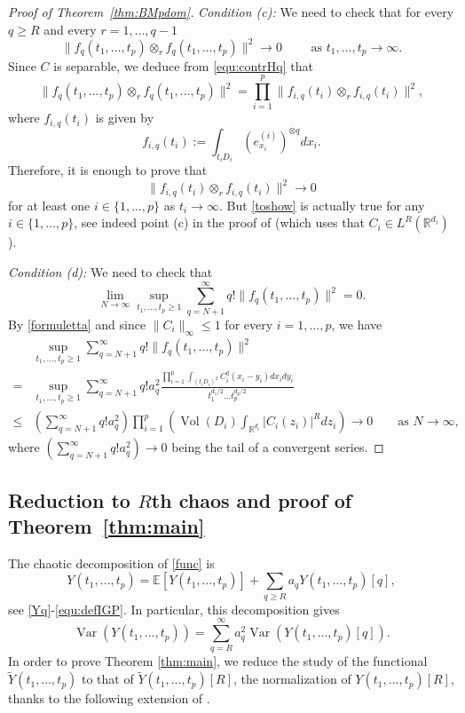\documentclass[12pt]{article}
\DeclareMathOperator{\var}{Var}
\DeclareMathOperator{\1}{1}
\DeclareMathOperator{\vol}{Vol}
\newcommand{\R}{\mathbb{R}}
\newcommand{\E}{\mathbb{E}}
\theoremstyle{plain}
\theoremstyle{definition}
\begin{document}
\begin{proof}[Proof of Theorem~\ref{thm:BMpdom}]
\textit{Condition (c):} We need to check that for every $q\ge R$ and every $r=1,\dots,q-1$
\[
\|f_{q}(t_1,\dots,t_p)\otimes_r f_{q}(t_1,\dots,t_p)\|^2\rightarrow 0 \quad \quad \text{ as }t_1,\ldots,t_p\rightarrow\infty.
\]
Since $C$ is separable, we deduce from \eqref{equ:contrHq} that
\[
\|f_{q}(t_1,\dots,t_p)\otimes_r f_{q}(t_1,\dots,t_p)\|^2=\prod_{i=1}^p\|f_{i,q}(t_i)\otimes_r f_{i,q}(t_i)\|^2,
\]
where $f_{i,q}(t_i)$ is given by
\[
f_{i,q}(t_i):=\int_{t_iD_i}(e_{x_i}^{(i)})^{\otimes q}dx_i.
\]
Therefore, it is enough to prove that
\begin{equation}\label{toshow}
\|f_{i,q}(t_i)\otimes_r f_{i,q}(t_i)\|^2\rightarrow 0
\end{equation}
for at least one $i\in\{1,\ldots,p\}$ as $t_i\rightarrow\infty$.
But \eqref{toshow} is actually true for any $i\in\{1,\ldots,p\}$,
see indeed point (c) in the proof of \cite[Theorem 7.2.4]{bluebook} (which uses that $C_i\in L^R(\R^{d_i})$).

\bigskip

\textit{Condition (d):} We need to check that
\[
\lim_{N\rightarrow\infty}\sup_{t_1,\ldots,t_p\geq 1}\sum_{q=N+1}^\infty q!\|f_{q}(t_1,\dots,t_p)\|^2=0.
\]
By \eqref{formuletta} and since $\|C_i\|_{\infty}\le 1$ for every $i=1,\dots,p$, we have
\begin{align*}
    &\sup_{t_1,\ldots,t_p\geq 1}\sum_{q=N+1}^\infty q!\|f_{q}(t_1,\dots,t_p)\|^2\\
    =&\sup_{t_1,\ldots,t_p\geq 1}\sum_{q=N+1}^\infty q!a_q^2\frac{\prod_{i=1}^p\int_{(t_iD_i)^2}C_i^q(x_i-y_i)dx_idy_i}{t_1^{d_1/2}\ldots t_p^{d_p/2}}\\
\le& \left( \sum_{q=N+1}^\infty q!a_q^2\right)\prod_{i=1}^p \left( \vol(D_i) \int_{\R^{d_i}}|C_i(z_i)|^Rdz_i\right)
\rightarrow 0 \quad \quad \text{as }N\rightarrow\infty,
\end{align*}
where $\left( \sum_{q=N+1}^\infty q!a_q^2\right)\rightarrow 0$ being the tail of a convergent series.
\end{proof}

\subsection{Reduction to \texorpdfstring{$R$}{R}th chaos and proof of Theorem~\ref{thm:main}}\label{subsec:main proof}

The chaotic decomposition of \eqref{func} is 
\begin{equation}\label{equ:chaosDecY}
    Y(t_1,\dots,t_p)=\E[{Y}(t_1,\ldots,t_p)]+ \sum_{q\ge R} a_q Y(t_1,\ldots,t_p)[q],
\end{equation}
see \eqref{Yq}-\eqref{equ:defIGP}. In particular, this decomposition gives
\begin{equation}
    \label{equ:vardecomp} \var(Y(t_1,\dots,t_p)) = \sum_{q=R}^\infty a_q^2 \var(Y(t_1,\dots,t_p)[q]).
\end{equation}
In order to prove Theorem \ref{thm:main}, we reduce the study of the functional $\widetilde Y(t_1,\dots,t_p)$ to that of $\widetilde{Y}(t_1,\dots,t_p)[R]$, the normalization of ${Y}(t_1,\dots,t_p)[R]$, thanks to the following extension of \cite[Proposition 4]{MN22}.
\end{document}
